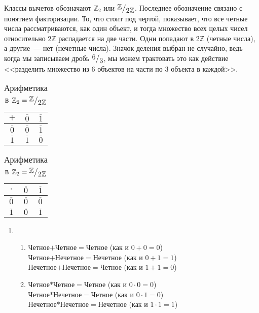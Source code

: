 \documentclass[russian]{lecture-notes}
\newcommand{\frc}[2]{\raisebox{2pt}{$#1$}\big/\raisebox{-3pt}{$#2$}}
\newcommand{\klas}[1]{\overline{#1}}
\begin{document}
Классы вычетов обозначают $\mathbb{Z}_2$ или $\frc{\mathbb{Z}}{2\mathbb{Z}}$. Последнее обозначение связано с понятием факторизации. То, что стоит под чертой, показывает, что все четные числа рассматриваются, как один объект, и тогда множество всех целых чисел относительно $2\mathbb{Z}$ распадается на две части. Одни попадают в $2\mathbb{Z}$ (четные числа), а другие~--- нет (нечетные числа). Значок деления выбран не случайно, ведь когда мы записываем дробь $\frc{6}{3}$, мы можем трактовать это как действие <<разделить множество из $6$ объектов на части по $3$ объекта в каждой>>.

\begin{table}[H]
	\caption{Арифметика в $\mathbb{Z}_2 = \frc{\mathbb{Z}}{2\mathbb{Z}}$}
	\centering
	\label{tab:arif}
	\begin{subtable}[H]{0.49\linewidth}
		\centering
		\label{tab:arif1}
		\begin{tabular}{|c|c|c|}
			\hline
			$+$ & $\klas{0}$ & $\klas{1}$ \\ \hline
			$\klas{0}$ & $\klas{0}$ & $\klas{1}$ \\ \hline
			$\klas{1}$ & $\klas{1}$ & $\klas{0}$ \\ 
			\hline
		\end{tabular}
	\end{subtable}
	\hfill
	\begin{subtable}[H]{0.49\linewidth}
		\centering
		\label{tab:arif2}
		\begin{tabular}{|c|c|c|}
			\hline
			$\cdot$ & $\klas{0}$ & $\klas{1}$ \\ \hline
			$\klas{0}$ & $\klas{0}$ & $\klas{0}$ \\ \hline
			$\klas{1}$ & $\klas{0}$ & $\klas{1}$ \\ 
			\hline
		\end{tabular}
	\end{subtable}
\end{table}

\begin{enumerate}
	\item 	\begin{enumerate}
				\item Четное$+$Четное$=$Четное (как и $0 + 0 = 0$) \\
					Четное$+$Нечетное$=$Нечетное (как и $0 + 1 = 1$) \\
					Нечетное$+$Нечетное$=$Четное (как и $1 + 1 = 0$)
				\item Четное$*$Четное$=$Четное (как и $0 \cdot 0 = 0$) \\
				Четное$*$Нечетное$=$Четное (как и $0 \cdot 1 = 0$) \\
				Нечетное$*$Нечетное$=$Нечетное (как и $1 \cdot 1 = 1$)
			\end{enumerate}
\end{enumerate}
\end{document}

